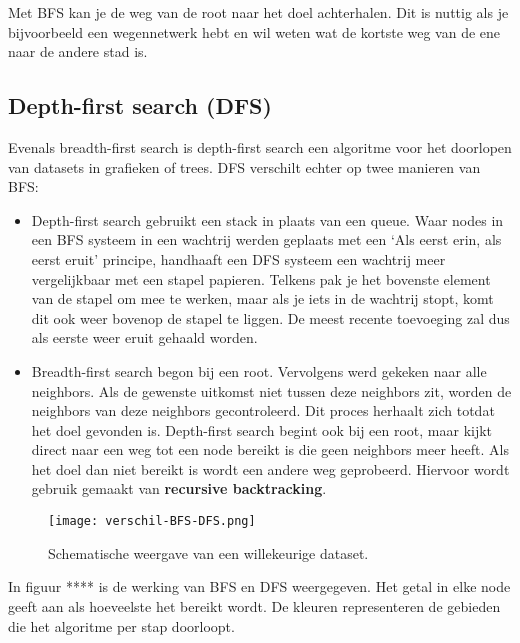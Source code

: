 Met BFS kan je de weg van de root naar het doel achterhalen. Dit is nuttig als je bijvoorbeeld een wegennetwerk hebt en wil weten wat de kortste weg van de ene naar de andere stad is.


\subsection{Depth-first search (DFS)}
Evenals breadth-first search is depth-first search een algoritme voor het doorlopen van datasets in grafieken of trees. DFS verschilt echter op twee manieren van BFS:

\begin{itemize}
\item Depth-first search gebruikt een stack in plaats van een queue. Waar nodes in een BFS systeem in een wachtrij werden geplaats met een `Als eerst erin, als eerst eruit' principe, handhaaft een DFS systeem een wachtrij meer vergelijkbaar met een stapel papieren. Telkens pak je het bovenste element van de stapel om mee te werken, maar als je iets in de wachtrij stopt, komt dit ook weer bovenop de stapel te liggen. De meest recente toevoeging zal dus als eerste weer eruit gehaald worden.
\item Breadth-first search begon bij een root. Vervolgens werd gekeken naar alle neighbors. Als de gewenste uitkomst niet tussen deze neighbors zit, worden de neighbors van deze neighbors gecontroleerd. Dit proces herhaalt zich totdat het doel gevonden is.
Depth-first search begint ook bij een root, maar kijkt direct naar een weg tot een node bereikt is die geen neighbors meer heeft. Als het doel dan niet bereikt is wordt een andere weg geprobeerd. Hiervoor wordt gebruik gemaakt van \textbf{recursive backtracking}.
\end{itemize}

\begin{figure}[h]
  \centering
    \texttt{[image: verschil-BFS-DFS.png]}
  \caption{Schematische weergave van een willekeurige dataset.}
  \label{fig:verschil-BFS-DFS}
\end{figure}

In figuur ****  is de werking van BFS en DFS weergegeven. Het getal in elke node geeft aan als hoeveelste het bereikt wordt. De kleuren representeren de gebieden die het algoritme per stap doorloopt.

